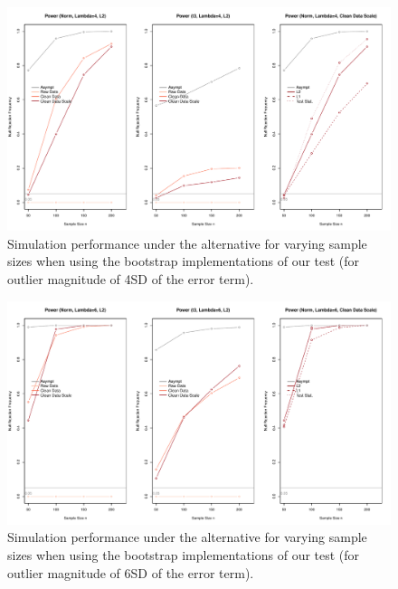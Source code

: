 \documentclass[11pt, letterpaper]{article}
\numberwithin{algorithm}{section}
\numberwithin{assumption}{section}
\numberwithin{lemma}{section}
\numberwithin{theorem}{section}
\numberwithin{corollary}{section}
\numberwithin{remark}{section}
\numberwithin{equation}{section}
\numberwithin{figure}{section}
\numberwithin{table}{section}
\begin{document}
\begin{figure}[!htbp]  %
\centering
\includegraphics[scale=0.5]{boot_alt_lambda4.pdf}
\caption{Simulation performance under the alternative for varying sample sizes when using the bootstrap implementations of our test (for outlier magnitude of 4SD of the error term).}
\label{fig_out_sim_alt_boot4}
\end{figure}

\begin{figure}[!htbp]  %
\centering
\includegraphics[scale=0.5]{boot_alt_lambda6.pdf}
\caption{Simulation performance under the alternative for varying sample sizes when using the bootstrap implementations of our test (for outlier magnitude of 6SD of the error term).}
\label{fig_out_sim_alt_boot6}
\end{figure}
\end{document}
